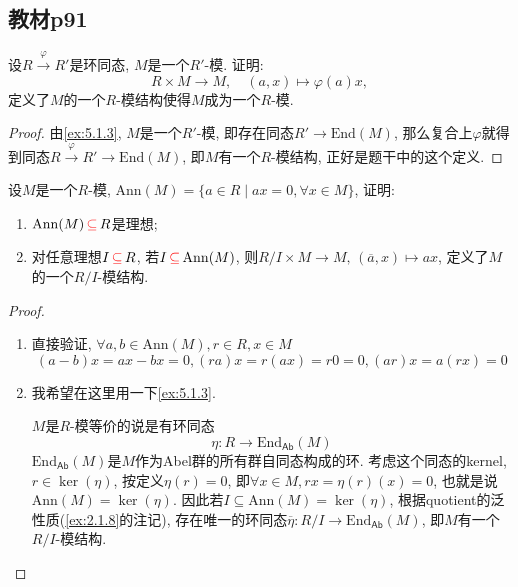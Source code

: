 \subsection{教材p91}

\begin{problem}
    设$R \xrightarrow{\varphi} R'$是环同态, $M$是一个$R'$-模. 证明:
    \[
        R \times M \to M,\quad (a, x) \mapsto \varphi(a)x,
    \]
    定义了$M$的一个$R$-模结构使得$M$成为一个$R$-模.
\end{problem}

\begin{proof}
    由\ref{ex:5.1.3}, $M$是一个$R'$-模, 即存在同态$R' \to \mathrm{End}(M)$, 那么复合上$\varphi$就得到同态$R \xrightarrow{\varphi} R' \to \mathrm{End}(M)$, 即$M$有一个$R$-模结构, 正好是题干中的这个定义.
\end{proof}

\begin{problem}
    设$M$是一个$R$-模, $\mathrm{Ann}(M) = \{a \in R \mid ax = 0, \forall x \in M\}$, 证明:
    \begin{enumerate}[(1)]
        \item $\mathrm{Ann}(M) \,\textcolor{red}{\subseteq}\, R$是理想;
        \item 对任意理想$I \,\textcolor{red}{\subseteq}\, R$, 若$I \,\textcolor{red}{\subseteq}\, \mathrm{Ann}(M)$, 则$R/I \times M \to M,\, (\overline{a},x) \mapsto ax$, 定义了$M$的一个$R/I$-模结构.
    \end{enumerate}
\end{problem}

\begin{proof}
    \begin{enumerate}[(1)]
        \item 直接验证, $\forall a, b \in \mathrm{Ann}(M), r \in R, x \in M$
        \[
            (a - b)x = ax - bx = 0, (ra)x = r(ax) = r0 = 0, (ar)x = a(rx) = 0
        \]
        \item 我希望在这里用一下\ref{ex:5.1.3}.
        
        $M$是$R$-模等价的说是有环同态
        \[
            \eta:R \to \mathrm{End}_\mathsf{Ab}(M)
        \]
        $\mathrm{End}_\mathsf{Ab}(M)$是$M$作为Abel群的所有群自同态构成的环. 考虑这个同态的kernel, $r \in \ker(\eta)$, 按定义$\eta(r) = 0$, 即$\forall x \in M, rx = \eta(r)(x) = 0$, 也就是说$\mathrm{Ann}(M) = \ker(\eta)$. 因此若$I \subseteq \mathrm{Ann}(M) = \ker(\eta)$, 根据quotient的泛性质(\ref{ex:2.1.8}的注记), 存在唯一的环同态$\overline{\eta}:R/I \to \mathrm{End}_\mathsf{Ab}(M)$, 即$M$有一个$R/I$-模结构.
    \end{enumerate}
\end{proof}

